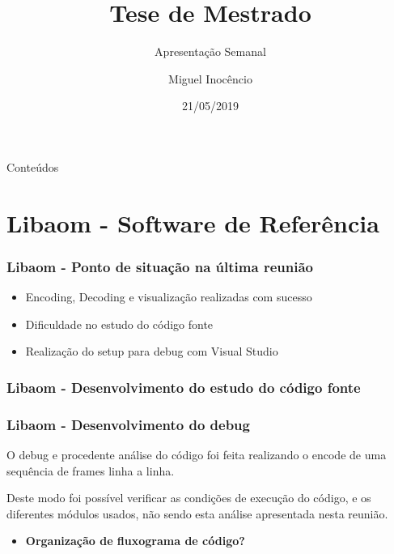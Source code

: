 \documentclass{beamer}
\title[Apresentação Semanal]{Tese de Mestrado}
\subtitle{Apresentação Semanal}
\author[M. Inocêncio]{Miguel Inocêncio}
\institute[UA]	{Universidade de Aveiro\\ 
				Instituto de Telecomunicações}
\date{21/05/2019}
\begin{document}
\begin{frame}
	\titlepage
\end{frame}

\begin{frame}{Conteúdos}
	\tableofcontents
\end{frame}

\section{Libaom - Software de Referência}
\begin{frame}
	\frametitle{Libaom - Ponto de situação na última reunião}

	\begin{itemize}
		\item Encoding, Decoding e visualização realizadas com sucesso
		\item Dificuldade no estudo do código fonte
		\item Realização do setup para debug com Visual Studio 		
	\end{itemize}

\end{frame}

\begin{frame}
	\frametitle{Libaom - Desenvolvimento do estudo do código fonte}


       \centering
\end{frame}

\begin{frame}
       \frametitle{Libaom - Desenvolvimento do debug}

       O debug e procedente análise do código foi feita realizando o encode de uma sequência de frames linha a linha.

       Deste modo foi possível verificar as condições de execução do código, e os diferentes módulos usados, não sendo esta análise apresentada nesta reunião.
       
       \begin{itemize}
              \item \textbf{Organização de fluxograma de código?} 
       \end{itemize}
\end{frame}
\end{document}
